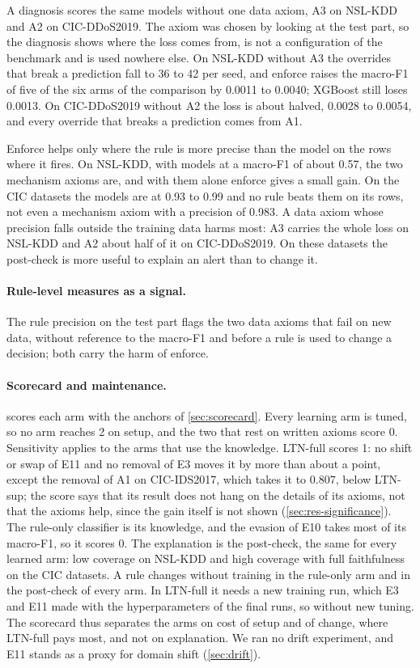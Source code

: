 A diagnosis scores the same models without one data axiom, A3 on NSL-KDD and A2 on CIC-DDoS2019. The axiom was chosen
by looking at the test part, so the diagnosis shows where the loss comes from, is not a configuration of the benchmark
and is used nowhere else. On NSL-KDD without A3 the overrides that break a prediction
fall to 36 to 42 per seed, and enforce raises the macro-F1 of five of the six arms of the comparison by 0.0011 to 0.0040;
XGBoost still loses 0.0013. On CIC-DDoS2019 without A2 the loss is about halved, 0.0028 to 0.0054, and every override that
breaks a prediction comes from A1.

Enforce helps only where the rule is more precise than the model on the rows where it fires. On NSL-KDD, with models at
a macro-F1 of about 0.57, the two mechanism axioms are, and with them alone enforce gives a small gain. On the CIC
datasets the models are at 0.93 to 0.99 and no rule beats them on its rows, not even a mechanism axiom with a precision
of 0.983. A data axiom whose precision falls outside the training data harms most: A3 carries the whole loss on NSL-KDD
and A2 about half of it on CIC-DDoS2019. On these datasets the post-check is more useful to explain an alert than to
change it.

\paragraph{Rule-level measures as a signal.}
The rule precision on the test part flags the two data axioms that fail on new data, without reference to the macro-F1
and before a rule is used to change a decision; both carry the harm of enforce.

\paragraph{Scorecard and maintenance.}
 scores each arm with the anchors of \cref{sec:scorecard}. Every learning arm is tuned, so no arm
reaches 2 on setup, and the two that rest on written axioms score 0. Sensitivity applies to the arms that use the
knowledge. LTN-full scores 1: no shift or swap of E11 and no removal of E3 moves it by more than about a point, except the
removal of A1 on CIC-IDS2017, which takes it to 0.807, below LTN-sup; the score says that its
result does not hang on the details of its axioms, not that the axioms help, since the gain itself is not shown
(\cref{sec:res-significance}). The rule-only classifier is its knowledge, and the evasion of E10 takes most of its
macro-F1, so it scores 0. The explanation is the post-check, the same for every learned arm: low coverage on NSL-KDD and
high coverage with full faithfulness on the CIC datasets. A rule changes without training in the rule-only arm and in the
post-check of every arm. In LTN-full it needs a new training run, which E3 and E11 made with the hyperparameters of the
final runs, so without new tuning. The scorecard thus separates the arms on cost of setup and of change, where LTN-full
pays most, and not on explanation. We ran no drift experiment, and E11 stands as a proxy for domain shift
(\cref{sec:drift}).

